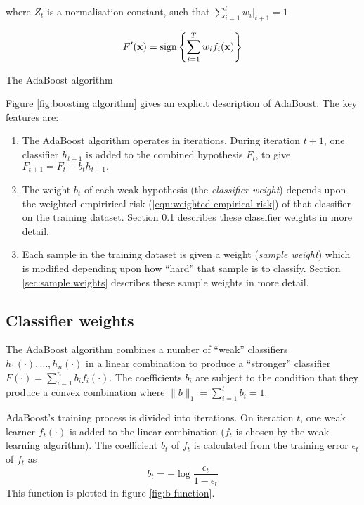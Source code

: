 \begin{linefigure}
\begin{enumerate}
	where $Z_t$ is a normalisation constant, such that
	$\sum_{i=1}^{l} w_i|_{t+1} = 1$
\end{enumerate}

\par
{} 
\begin{equation}
F'(\mathbf{x}) = \mathrm{sign} \left\{ \sum_{i=1}^T w_i f_i(\mathbf{x}) \right\}
\end{equation}
\caption{The AdaBoost algorithm}
\end{linefigure}


Figure \ref{fig:boosting algorithm} gives an explicit description of
AdaBoost.  The key features are:
%
\begin{enumerate}
\item	The AdaBoost algorithm operates in iterations.  During
	iteration $t+1$, one classifier $h_{t+1}$ is added to the combined
	hypothesis $F_{t}$, to give $F_{t+1} = F_t + b_t h_{t+1}.$
\item	The weight $b_t$ of each weak hypothesis (the \emph{classifier
	weight}) depends upon the weighted empirirical risk
	(\ref{eqn:weighted empirical risk}) of that classifier on the
	training dataset.  Section \ref{sec:classifier weights}
	describes these classifier weights in more detail. 
\item	Each sample in the training dataset is given a weight
	(\emph{sample weight}) which is modified depending upon how
	``hard'' that sample is to classify.  Section \ref{sec:sample
	weights} describes these sample weights in more detail.
\end{enumerate}


\subsection{Classifier weights}
\label{sec:classifier weights}

The AdaBoost algorithm combines a number of ``weak'' classifiers
$h_1(\cdot), \ldots, h_n(\cdot)$ in a linear combination to produce a
``stronger'' classifier $F(\cdot) = \sum_{i=1}^{n} b_i f_i(\cdot)$.
The coefficients $b_i$ are subject to the condition that they produce a
convex combination where $\|b\|_1 = \sum_{i=1}^{t} b_i = 1$.

AdaBoost's training process is divided into iterations.  On iteration
$t$, one weak learner $f_t(\cdot)$ is added to the linear
combination ($f_t$ is chosen by the weak learning algorithm).  The
coefficient $b_t$ of $f_t$ is calculated from the 
training error $\epsilon_t$ of $f_t$ as 
%
\begin{equation}
b_t = - \log \frac{\epsilon_t}{1 - \epsilon_t}
\label{eqn:theory:bt}
\end{equation}
%
This function is plotted in figure \ref{fig:b function}.

